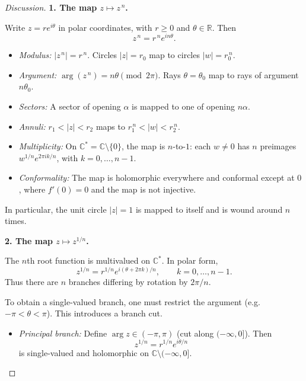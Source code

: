 \documentclass[12pt, a4paper]{report}
\theoremstyle{spaced}
\begin{document}
\begin{proof}[Discussion]
	\textbf{1. The map $z \mapsto z^{\,n}$.}

	Write $z = r e^{i\theta}$ in polar coordinates, with $r \ge 0$ and
	$\theta \in \mathbb{R}$.  Then
	\[
		z^{\,n} = r^{\,n} e^{i n \theta}.
	\]

	\begin{itemize}
		\item \emph{Modulus:} $|z^{\,n}| = r^{\,n}$.
		      Circles $|z| = r_0$ map to circles $|w| = r_0^{\,n}$.

		\item \emph{Argument:} $\arg(z^{\,n}) = n\theta \pmod{2\pi}$.
		      Rays $\theta = \theta_0$ map to rays of argument $n\theta_0$.

		\item \emph{Sectors:}
		      A sector of opening $\alpha$ is mapped to one of opening $n\alpha$.

		\item \emph{Annuli:}
		      $r_1 < |z| < r_2$ maps to $r_1^{\,n} < |w| < r_2^{\,n}$.

		\item \emph{Multiplicity:}
		      On $\mathbb{C}^\ast = \mathbb{C} \setminus \{0\}$, the map is
		      $n$-to-$1$:
		      each $w \ne 0$ has $n$ preimages
		      $w^{1/n} e^{2\pi i k/n}$, with $k = 0,\dots,n-1$.

		\item \emph{Conformality:}
		      The map is holomorphic everywhere and conformal except at $0$,
		      where $f'(0)=0$ and the map is not injective.
	\end{itemize}

	In particular, the unit circle $|z|=1$ is mapped to itself and is
	wound around $n$ times.

	\medskip
	\noindent
	\textbf{2. The map $z \mapsto z^{1/n}$.}

	The $n$th root function is multivalued on $\mathbb{C}^\ast$.
	In polar form,
	\[
		z^{1/n} = r^{1/n} e^{ i(\theta + 2\pi k)/n },
		\qquad k = 0,\dots,n-1.
	\]
	Thus there are $n$ branches differing by rotation by $2\pi/n$.

	To obtain a single-valued branch, one must restrict the argument
	(e.g.\ $-\pi < \theta < \pi$).
	This introduces a branch cut.

	\begin{itemize}
		\item \emph{Principal branch:}
		      Define $\arg z \in (-\pi,\pi)$ (cut along $(-\infty,0]$).
		      Then
		      \[
			      z^{1/n} = r^{1/n} e^{ i\theta/n }
		      \]
		      is single-valued and holomorphic on $\mathbb{C}\setminus(-\infty,0]$.


\end{itemize}
\end{proof}
\end{document}
